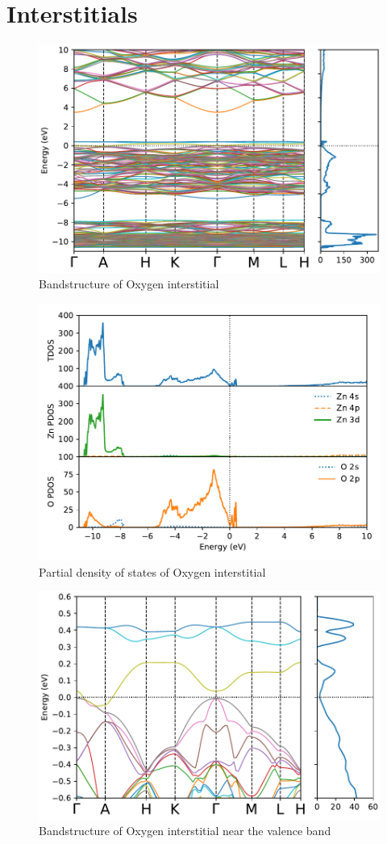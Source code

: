 \clearpage

\section{Interstitials}

\begin{figure}[tbh!]
	\centering
	\includegraphics[width=0.7\linewidth]{"images/rnd/band-dos_O_i"}
	\caption[Bandstructure of Oxygen interstitial]{Bandstructure of Oxygen interstitial}
\end{figure}

\begin{figure}[tbh!]
	\centering
	\includegraphics[width=0.7\linewidth]{"images/rnd/dos-pdos_O_i"}
	\caption[Partial density of states of Oxygen interstitial]{Partial density of states of Oxygen interstitial}
\end{figure}

\begin{figure}[tbh!]
	\centering
	\includegraphics[width=0.7\linewidth]{"images/rnd/band-dos-close_O_i"}
	\caption[Bandstructure of Oxygen interstitial near the valence band]{Bandstructure of Oxygen interstitial near the valence band}
\end{figure}

